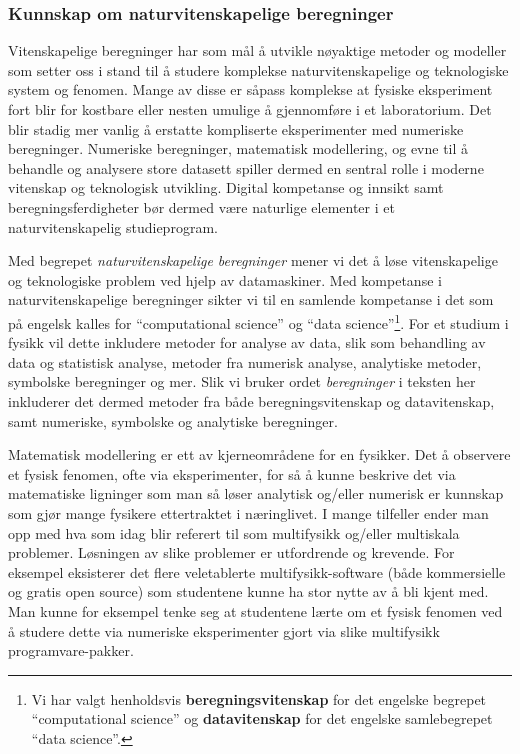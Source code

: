 \documentclass{article}
\begin{document}
\subsubsection{Kunnskap om naturvitenskapelige beregninger}
Vitenskapelige beregninger har som mål å utvikle nøyaktige metoder og modeller som setter oss i stand til å studere komplekse naturvitenskapelige og teknologiske system og fenomen. Mange av disse er såpass komplekse at fysiske eksperiment fort blir for kostbare eller nesten umulige å gjennomføre i et laboratorium. Det blir stadig mer vanlig å erstatte kompliserte eksperimenter med numeriske beregninger. Numeriske beregninger, matematisk modellering, og evne til å behandle og analysere store datasett spiller dermed en sentral rolle i moderne vitenskap og teknologisk utvikling. Digital kompetanse og innsikt samt beregningsferdigheter bør dermed være naturlige elementer i et naturvitenskapelig studieprogram.

Med begrepet \emph{naturvitenskapelige beregninger} mener vi det å løse vitenskapelige og teknologiske problem ved hjelp av datamaskiner.
Med kompetanse i naturvitenskapelige beregninger sikter vi til en samlende kompetanse i det som på engelsk kalles for ``computational science'' og ``data science''\footnote{Vi har valgt henholdsvis {\bf beregningsvitenskap} for det engelske begrepet ``computational science'' og {\bf datavitenskap} for det engelske samlebegrepet ``data science''.}. For et studium i fysikk vil dette inkludere metoder for analyse av data, slik som behandling av data og statistisk analyse, metoder fra numerisk analyse, analytiske metoder, symbolske beregninger og mer. Slik vi bruker ordet \emph{beregninger} i teksten her inkluderer det dermed metoder fra både beregningsvitenskap og datavitenskap, samt numeriske, symbolske og analytiske beregninger.

Matematisk modellering er ett av kjerneområdene for en fysikker. Det å observere et fysisk fenomen, ofte via eksperimenter, for så å kunne beskrive det via matematiske ligninger som man så løser analytisk og/eller numerisk er kunnskap som gjør mange fysikere ettertraktet i næringlivet. I mange tilfeller ender man opp med hva som idag blir referert til som multifysikk og/eller multiskala problemer.
Løsningen av slike problemer er utfordrende og krevende.
For eksempel eksisterer det flere veletablerte  multifysikk-software (både kommersielle og gratis open source) som studentene kunne ha stor nytte av å bli kjent med.
Man kunne for eksempel tenke seg at studentene lærte om et fysisk fenomen ved å studere dette via numeriske eksperimenter gjort via slike multifysikk programvare-pakker.
\end{document}
